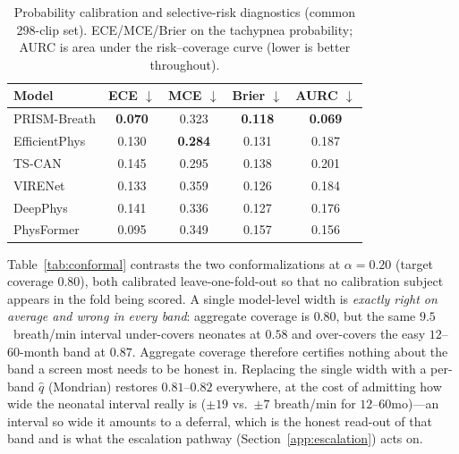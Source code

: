 \begin{table}[!t]
\caption{Probability calibration and selective-risk diagnostics (common 298-clip set). ECE/MCE/Brier on the
tachypnea probability; AURC is area under the risk--coverage curve (lower is better throughout).}
\label{tab:calib}\centering\small
\begin{tabular}{@{}lcccc@{}}\toprule
Model & ECE $\downarrow$ & MCE $\downarrow$ & Brier $\downarrow$ & AURC $\downarrow$\\\midrule
PRISM-Breath  & \textbf{0.070} & 0.323 & \textbf{0.118} & \textbf{0.069}\\
EfficientPhys & 0.130 & \textbf{0.284} & 0.131 & 0.187\\
TS-CAN        & 0.145 & 0.295 & 0.138 & 0.201\\
VIRENet       & 0.133 & 0.359 & 0.126 & 0.184\\
DeepPhys      & 0.141 & 0.336 & 0.127 & 0.176\\
PhysFormer    & 0.095 & 0.349 & 0.157 & 0.156\\\bottomrule
\end{tabular}
\end{table}

Table~\ref{tab:conformal} contrasts the two conformalizations at $\alpha{=}0.20$ (target coverage $0.80$),
both calibrated leave-one-fold-out so that no calibration subject appears in the fold being scored. A
single model-level width is \emph{exactly right on average and wrong in every band}: aggregate coverage
is $0.80$, but the same $9.5$~breath/min interval under-covers neonates at $0.58$ and over-covers the easy
$12$--$60$-month band at $0.87$. Aggregate coverage therefore certifies nothing about the band a screen
most needs to be honest in. Replacing the single width with a per-band $\hat q$ (Mondrian) restores
$0.81$--$0.82$ everywhere, at the cost of admitting how wide the neonatal interval really is
($\pm19$ vs.\ $\pm7$ breath/min for $12$--$60$mo)---an interval so wide it amounts to a deferral, which is
the honest read-out of that band and is what the escalation pathway (Section~\ref{app:escalation}) acts on.

